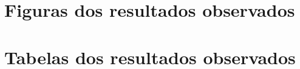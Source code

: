 \documentclass{article}
\begin{document}
\storeareas\normalsetting
{}
\recalctypearea

\section{Figuras dos resultados observados}
\label{sec:figures}









\section{Tabelas dos resultados observados}
\label{sec:tabelas}









\clearpage
\normalsetting
\end{document}
